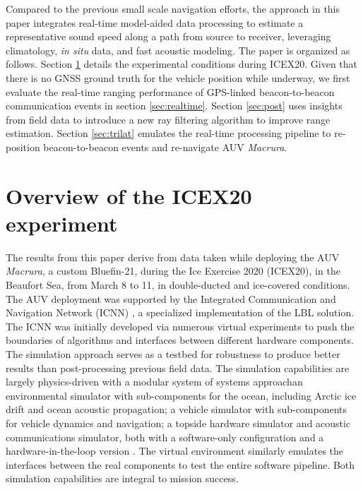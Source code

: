 Compared to the previous small scale navigation efforts, the approach in this paper integrates real-time model-aided data processing to estimate a representative sound speed along a path from source to receiver, leveraging climatology, \textit{in situ} data, and fast acoustic modeling.
The paper is organized as follows.
Section \ref{sec:icex20} details the experimental conditions during ICEX20.
Given that there is no GNSS ground truth for the vehicle position while underway, we first evaluate the real-time ranging performance of GPS-linked beacon-to-beacon communication events in section \ref{sec:realtime}.
Section \ref{sec:post} uses insights from field data to introduce a new ray filtering algorithm to improve range estimation.
Section \ref{sec:trilat} emulates the real-time processing pipeline to re-position beacon-to-beacon events and re-navigate AUV \emph{Macrura}.

\clearpage
\section{Overview of the ICEX20 experiment}\label{sec:icex20}

The results from this paper derive from data taken while deploying the AUV \emph{Macrura}, a custom Bluefin-21, during the Ice Exercise 2020 (ICEX20), in the Beaufort Sea, from March 8 to 11, in double-ducted and ice-covered conditions.
The AUV deployment was supported by the Integrated Communication and Navigation Network (ICNN) \citep{schneider_self-adapting_2020,randeni_construction_2020,randeni_high-resolution_2021}, a specialized implementation of the LBL solution.
The ICNN was initially developed via numerous virtual experiments to push the boundaries of algorithms and interfaces between different hardware components.
The simulation approach serves as a testbed for robustness to produce better results than post-processing previous field data.
The simulation capabilities are largely physics-driven with a modular system of systems approach\textemdash an environmental simulator with sub-components for the ocean, including Arctic ice drift and ocean acoustic propagation; a vehicle simulator with sub-components for vehicle dynamics and navigation; a topside hardware simulator and acoustic communications simulator, both with a software-only configuration and a hardware-in-the-loop version \citep{schneider_netsim_2018}.
The virtual environment similarly emulates the interfaces between the real components to test the entire software pipeline.
Both simulation capabilities are integral to mission success.

